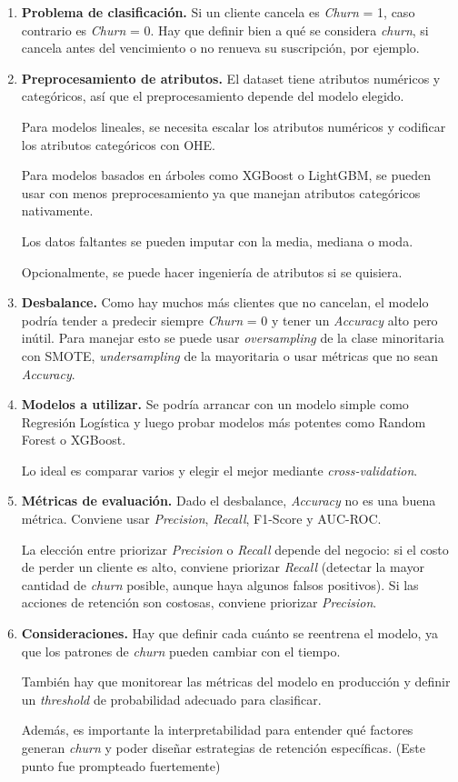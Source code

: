 \documentclass[a4paper,12pt]{article}
\begin{document}
           \begin{enumerate}
               \item \textbf{Problema de clasificación.} Si un cliente cancela es \textit{Churn} = 1, caso contrario es \textit{Churn} = 0. Hay que definir bien a qué se considera \textit{churn}, si cancela antes del vencimiento o no renueva su suscripción, por ejemplo.
                \item \textbf{Preprocesamiento de atributos.} El dataset tiene atributos numéricos y categóricos, así que el preprocesamiento depende del modelo elegido. 

                    Para modelos lineales, se necesita escalar los atributos numéricos y codificar los atributos categóricos con OHE. 

                    Para modelos basados en árboles como XGBoost o LightGBM, se pueden usar con menos preprocesamiento ya que manejan atributos categóricos nativamente. 

                    Los datos faltantes se pueden imputar con la media, mediana o moda.

                    Opcionalmente, se puede hacer ingeniería de atributos si se quisiera.
                \item \textbf{Desbalance.} Como hay muchos más clientes que no cancelan, el modelo podría tender a predecir siempre \textit{Churn} = 0 y tener un \textit{Accuracy} alto pero inútil. Para manejar esto se puede usar \textit{oversampling} de la clase minoritaria con SMOTE, \textit{undersampling} de la mayoritaria o usar métricas que no sean \textit{Accuracy}.
                \item \textbf{Modelos a utilizar.} Se podría arrancar con un modelo simple como Regresión Logística y luego probar modelos más potentes como Random Forest o XGBoost.

                    Lo ideal es comparar varios y elegir el mejor mediante \textit{cross-validation}.
                \item \textbf{Métricas de evaluación.} Dado el desbalance, \textit{Accuracy} no es una buena métrica. Conviene usar \textit{Precision}, \textit{Recall}, F1-Score y AUC-ROC.

                    La elección entre priorizar \textit{Precision} o \textit{Recall} depende del negocio: si el costo de perder un cliente es alto, conviene priorizar \textit{Recall} (detectar la mayor cantidad de \textit{churn} posible, aunque haya algunos falsos positivos). Si las acciones de retención son costosas, conviene priorizar \textit{Precision}.
                \item \textbf{Consideraciones.} Hay que definir cada cuánto se reentrena el modelo, ya que los patrones de \textit{churn} pueden cambiar con el tiempo.

                    También hay que monitorear las métricas del modelo en producción y definir un \textit{threshold} de probabilidad adecuado para clasificar. 

                    Además, es importante la interpretabilidad para entender qué factores generan \textit{churn} y poder diseñar estrategias de retención específicas. (Este punto fue prompteado fuertemente)
            \end{enumerate}
\end{document}
